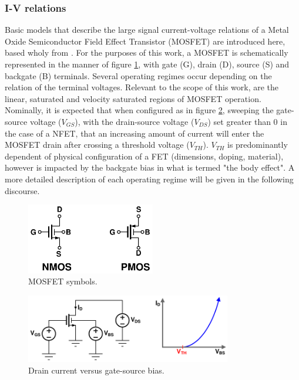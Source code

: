 	\subsubsection{I-V relations}
	Basic models that describe the large signal current-voltage relations of a Metal Oxide Semiconductor Field Effect Transistor (MOSFET) are introduced here, based wholy from \cite{razavi_2017}. For the purposes of this work, a MOSFET is schematically represented in the manner of figure \ref{fig:mos_symbols}, with gate (G), drain (D), source (S) and backgate (B) terminals. Several operating regimes occur depending on the relation of the terminal voltages. Relevant to the scope of this work, are the linear, saturated and velocity saturated regions of MOSFET operation. Nominally, it is expected that when configured as in figure \ref{fig:vgs_sweep}, sweeping the gate-source voltage ($V_{GS}$), with the drain-source voltage ($V_{DS}$) set greater than 0 in the case of a NFET, that an increasing amount of current will enter the MOSFET drain after crossing a threshold voltage ($V_{TH}$). $V_{TH}$ is predominantly dependent of physical configuration of a FET (dimensions, doping, material), however is impacted by the backgate bias in what is termed "the body effect". A more detailed description of each operating regime will be given in the following discourse.

			\begin{figure}[htb!]
			        \centering
			        \includegraphics[width=0.5\textwidth, angle=0]{./figs/theory/fet_symbols}
			    \caption{MOSFET symbols.}
			    \label{fig:mos_symbols}
			\end{figure}

			\begin{figure}[htb!]
			        \centering
			        \includegraphics[width=0.8\textwidth, angle=0]{./figs/theory/vgs_sweep}
			    \caption{Drain current versus gate-source bias.}
			    \label{fig:vgs_sweep}
			\end{figure}



